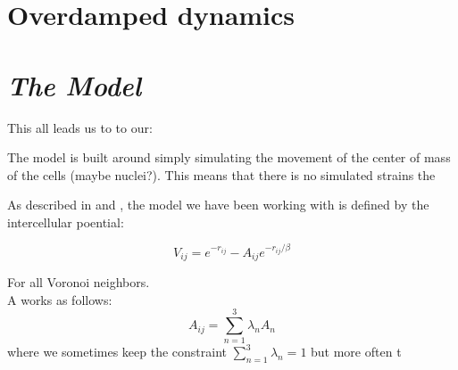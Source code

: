 \section{Overdamped dynamics}

\section{\textit{The Model}}
This all leads us to to our:


The model is built around simply simulating the movement of the center of mass of the cells (maybe nuclei?). This means that there is no simulated strains the


As described in \cite{} and \cite{}, the model we have been working with is defined by the intercellular poential:

\begin{equation}
    V_{ij}=e^{-r_{ij}}-A_{ij}e^{-r_{ij}/\beta}
\end{equation}

For all Voronoi neighbors.\\

A works as follows:
\begin{equation}
    A_{ij}=\sum_{n=1}^{3}\lambda_n A_n
\end{equation}
where we sometimes keep the constraint $\sum_{n=1}^{3}\lambda_n=1$ but more often t
